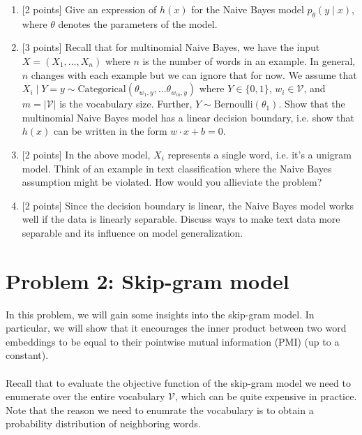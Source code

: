 \documentclass{article}
\theoremstyle{case}
\theoremstyle{definition}
\newcommand{\recall}[1]{\noindent{[\textbf{RECALL:} #1]}}
\begin{document}
\begin{enumerate}
    \item {[2 points]} Give an expression of $h(x)$ for the Naive Bayes model $p_\theta(y\mid x)$, where $\theta$ denotes the parameters of the model.

    \newpage
\item {[3 points]} Recall that for multinomial Naive Bayes,
        we have the input $X=(X_1, \ldots, X_n)$ where $n$ is the number of words in an example.
        In general, $n$ changes with each example but we can ignore that for now.
        We assume that $X_i\mid Y=y \sim \text{Categorical}(\theta_{w_1,y}, \ldots \theta_{w_m,y})$ where $Y\in \{0, 1\}$, $w_i\in\mathcal{V}$, and $m=|\mathcal{V}|$ is the vocabulary size.
        Further, $Y\sim\text{Bernoulli}(\theta_1)$.
        Show that the multinomial Naive Bayes model has a linear decision boundary,
        i.e. show that $h(x)$ can be written in the form $w\cdot x + b=0$.
        \recall{
            The categorical distribution is a multinomial distribution with one trial.
            Its PMF is
            $$
            p(x_1,\ldots, x_m) = \prod_{i=1}^m\theta_{i}^{x_i} \;,
            $$
            where $x_i = \mathbbm{1}[x=i]$, $\sum_{i=1}^m x_i = 1$,
            and $\sum_{i=1}^m \theta_i = 1$.
        }
    
    \newpage
\item {[2 points]} In the above model, $X_i$ represents a single word, i.e. it's a unigram model.
    Think of an example in text classification where the Naive Bayes assumption might be violated.
    How would you allieviate the problem?

\item {[2 points]} Since the decision boundary is linear, the Naive Bayes model works well if the data is linearly separable.
        Discuss ways to make text data more separable and its influence on model generalization.

\newpage
\end{enumerate}

\section*{Problem 2: Skip-gram model}
In this problem, we will gain some insights into the skip-gram model.
In particular, we will show that it
encourages the inner product between two word embeddings
to be equal to their pointwise mutual information (PMI) (up to a constant).
\\ \\
Recall that to evaluate the objective function of the skip-gram model
we need to enumerate over the entire vocabulary $\mathcal{V}$,
which can be quite expensive in practice.
Note that the reason we need to enumrate the vocabulary
is to obtain a probability distribution of neighboring words.
\end{document}
